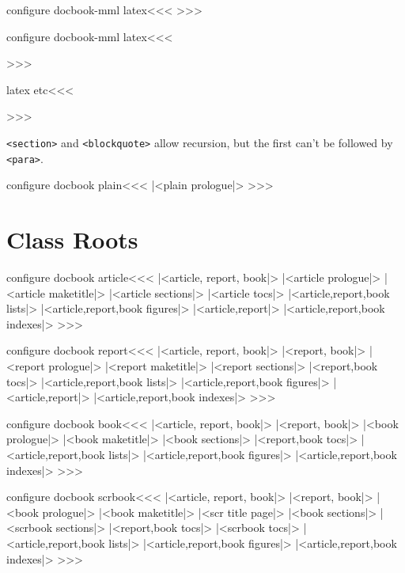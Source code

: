 \<configure docbook-mml latex\><<< 
  {\ifmtext {}%
   \else {}\fi}
>>>

\<configure docbook-mml latex\><<<
   {\IgnorePar\EndP{}}
   {}
   {\IgnorePar{}\ShowPar\par}
>>>







\<latex etc\><<<
   {\IgnorePar\EndP{}}
   {\ShowPar\par}
   {\IgnorePar\EndP{}\ShowPar\par}
>>>

\verb+<section>+ and \verb+<blockquote>+ allow recursion,
but the first can't be followed by \verb+<para>+.


\<configure docbook plain\><<< 
|<plain prologue|>
>>>

\section{Class Roots}

\<configure docbook article\><<< 
|<article, report, book|>
|<article prologue|>
|<article maketitle|>
|<article sections|>
|<article tocs|>
|<article,report,book lists|>
|<article,report,book figures|>
|<article,report|>
|<article,report,book indexes|>
>>>



\<configure docbook report\><<< 
|<article, report, book|>
|<report, book|>
|<report prologue|>
|<report maketitle|>
|<report sections|>
|<report,book tocs|>
|<article,report,book lists|>
|<article,report,book figures|>
|<article,report|>
|<article,report,book indexes|>
>>>



\<configure docbook book\><<< 
|<article, report, book|>
|<report, book|>
|<book prologue|>
|<book maketitle|>
|<book sections|>
|<report,book tocs|>
|<article,report,book lists|>
|<article,report,book figures|>
|<article,report,book indexes|>
>>>




\<configure docbook scrbook\><<< 
|<article, report, book|>
|<report, book|>
|<book prologue|>
|<book maketitle|>
|<scr title page|>
|<book sections|>
|<scrbook sections|>
|<report,book tocs|>
|<scrbook tocs|>
|<article,report,book lists|>
|<article,report,book figures|>
|<article,report,book indexes|>
>>>


